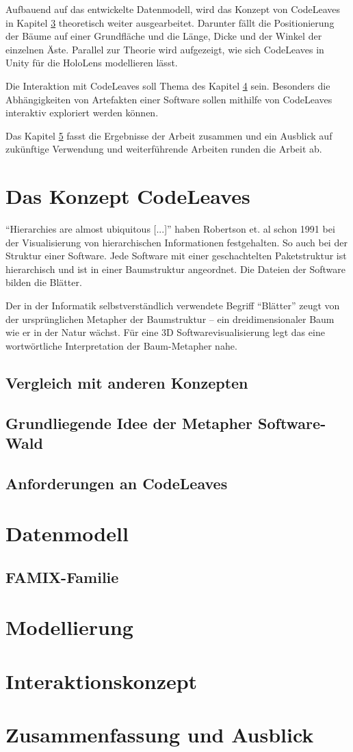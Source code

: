 Aufbauend auf das entwickelte Datenmodell, wird das Konzept von CodeLeaves in Kapitel \ref{ch:modelling} theoretisch weiter ausgearbeitet. Darunter fällt die Positionierung der Bäume auf einer Grundfläche und die Länge, Dicke und der Winkel der einzelnen Äste. Parallel zur Theorie wird aufgezeigt, wie sich CodeLeaves in Unity für die HoloLens modellieren lässt.

Die Interaktion mit CodeLeaves soll Thema des Kapitel \ref{ch:interaction} sein. Besonders die Abhängigkeiten von Artefakten einer Software sollen mithilfe von CodeLeaves interaktiv exploriert werden können.

Das Kapitel \ref{ch:conclusion} fasst die Ergebnisse der Arbeit zusammen und ein Ausblick auf zukünftige Verwendung und weiterführende Arbeiten runden die Arbeit ab.

\chapter{Das Konzept CodeLeaves}
\label{ch:concept}

``Hierarchies are almost ubiquitous [...]'' \cite{robertson1991cone} haben Robertson et. al schon 1991 bei der Visualisierung von hierarchischen Informationen festgehalten. So auch bei der Struktur einer Software. Jede Software mit einer geschachtelten Paketstruktur ist hierarchisch und ist in einer Baumstruktur angeordnet. Die Dateien der Software bilden die Blätter.

Der in der Informatik selbstverständlich verwendete Begriff "`Blätter"' zeugt von der ursprünglichen Metapher der Baumstruktur -- ein dreidimensionaler Baum wie er in der Natur wächst. Für eine 3D Softwarevisualisierung legt das eine wortwörtliche Interpretation der Baum-Metapher nahe.

\section{Vergleich mit anderen Konzepten}
\label{sec:comparison}
\section{Grundliegende Idee der Metapher Software-Wald}
\label{sec:idea}
\section{Anforderungen an CodeLeaves}
\label{sec:requirements}

\chapter{Datenmodell}
\label{ch:data-model}
\section{FAMIX-Familie}

\chapter{Modellierung}
\label{ch:modelling}

\chapter{Interaktionskonzept}
\label{ch:interaction}
\chapter{Zusammenfassung und Ausblick}
\label{ch:conclusion}
